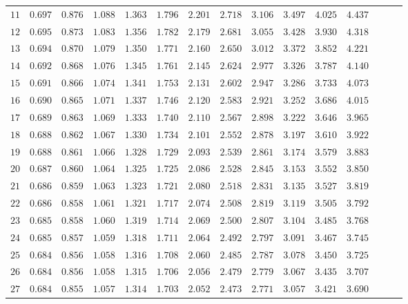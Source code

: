 \begin{center}
\begin{tabular}{@{}c*{14}{r}@{}}
$11$ & $0.697$ & $0.876$ & $1.088$ & $1.363$ & $1.796$ & $2.201$ & $2.718$ & $3.106$ & $3.497$ & $4.025$ & $4.437$ \\
$12$ & $0.695$ & $0.873$ & $1.083$ & $1.356$ & $1.782$ & $2.179$ & $2.681$ & $3.055$ & $3.428$ & $3.930$ & $4.318$ \\
$13$ & $0.694$ & $0.870$ & $1.079$ & $1.350$ & $1.771$ & $2.160$ & $2.650$ & $3.012$ & $3.372$ & $3.852$ & $4.221$ \\
$14$ & $0.692$ & $0.868$ & $1.076$ & $1.345$ & $1.761$ & $2.145$ & $2.624$ & $2.977$ & $3.326$ & $3.787$ & $4.140$ \\
$15$ & $0.691$ & $0.866$ & $1.074$ & $1.341$ & $1.753$ & $2.131$ & $2.602$ & $2.947$ & $3.286$ & $3.733$ & $4.073$ \\
$16$ & $0.690$ & $0.865$ & $1.071$ & $1.337$ & $1.746$ & $2.120$ & $2.583$ & $2.921$ & $3.252$ & $3.686$ & $4.015$ \\
$17$ & $0.689$ & $0.863$ & $1.069$ & $1.333$ & $1.740$ & $2.110$ & $2.567$ & $2.898$ & $3.222$ & $3.646$ & $3.965$ \\
$18$ & $0.688$ & $0.862$ & $1.067$ & $1.330$ & $1.734$ & $2.101$ & $2.552$ & $2.878$ & $3.197$ & $3.610$ & $3.922$ \\
$19$ & $0.688$ & $0.861$ & $1.066$ & $1.328$ & $1.729$ & $2.093$ & $2.539$ & $2.861$ & $3.174$ & $3.579$ & $3.883$ \\
$20$ & $0.687$ & $0.860$ & $1.064$ & $1.325$ & $1.725$ & $2.086$ & $2.528$ & $2.845$ & $3.153$ & $3.552$ & $3.850$ \\
$21$ & $0.686$ & $0.859$ & $1.063$ & $1.323$ & $1.721$ & $2.080$ & $2.518$ & $2.831$ & $3.135$ & $3.527$ & $3.819$ \\
$22$ & $0.686$ & $0.858$ & $1.061$ & $1.321$ & $1.717$ & $2.074$ & $2.508$ & $2.819$ & $3.119$ & $3.505$ & $3.792$ \\
$23$ & $0.685$ & $0.858$ & $1.060$ & $1.319$ & $1.714$ & $2.069$ & $2.500$ & $2.807$ & $3.104$ & $3.485$ & $3.768$ \\
$24$ & $0.685$ & $0.857$ & $1.059$ & $1.318$ & $1.711$ & $2.064$ & $2.492$ & $2.797$ & $3.091$ & $3.467$ & $3.745$ \\
$25$ & $0.684$ & $0.856$ & $1.058$ & $1.316$ & $1.708$ & $2.060$ & $2.485$ & $2.787$ & $3.078$ & $3.450$ & $3.725$ \\
$26$ & $0.684$ & $0.856$ & $1.058$ & $1.315$ & $1.706$ & $2.056$ & $2.479$ & $2.779$ & $3.067$ & $3.435$ & $3.707$ \\
$27$ & $0.684$ & $0.855$ & $1.057$ & $1.314$ & $1.703$ & $2.052$ & $2.473$ & $2.771$ & $3.057$ & $3.421$ & $3.690$ \\

\end{tabular}
\end{center}
